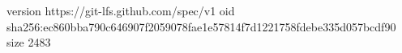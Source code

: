 version https://git-lfs.github.com/spec/v1
oid sha256:ec860bba790c646907f2059078fae1e57814f7d1221758fdebe335d057bcdf90
size 2483
